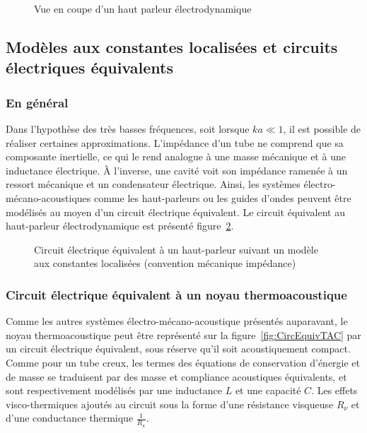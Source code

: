 \begin{figure}[!ht]
    \centering
    
    \caption{Vue en coupe d'un haut parleur électrodynamique}
    \label{fig:HautParleur}
\end{figure}

\subsection{Modèles aux constantes localisées et circuits électriques équivalents}

\subsubsection{En général}

Dans l'hypothèse des très basses fréquences, soit lorsque $ka \ll 1$, il est possible de réaliser certaines approximations. L'impédance d'un tube ne comprend que sa composante inertielle, ce qui le rend analogue à une masse mécanique et à une inductance électrique. À l'inverse, une cavité voit son impédance ramenée à un ressort mécanique et un condensateur électrique. Ainsi, les systèmes électro-mécano-acoustiques comme les haut-parleurs ou les guides d'ondes peuvent être modélisés au moyen d'un circuit électrique équivalent. Le circuit équivalent au haut-parleur électrodynamique est présenté figure~\ref{fig:HP_LEM}.

\begin{figure}[!ht]
    \centering
    
    \caption{Circuit électrique équivalent à un haut-parleur suivant un modèle aux constantes localisées (convention mécanique impédance)}
    \label{fig:HP_LEM}
\end{figure}

\subsubsection{Circuit électrique équivalent à un noyau thermoacoustique}

Comme les autres systèmes électro-mécano-acoustique présentés auparavant, le noyau thermoacoustique peut être représenté sur la figure~\ref{fig:CircEquivTAC} par un circuit électrique équivalent, sous réserve qu'il soit acoustiquement compact. Comme pour un tube creux, les termes des équations de conservation d'énergie et de masse se traduisent par des masse et compliance acoustiques équivalents, et sont respectivement modélisés par une inductance $L$ et une capacité $C$. Les effets visco-thermiques ajoutés au circuit sous la forme d'une résistance visqueuse $R_\nu$ et d'une conductance thermique $\frac{1}{R_\kappa}$.

